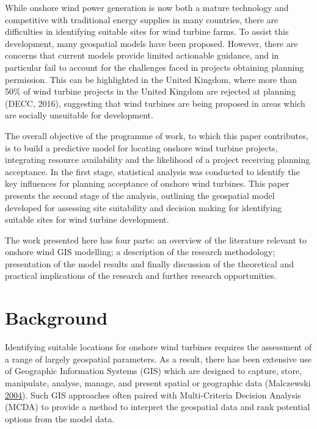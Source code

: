 \documentclass[a4paper,]{article}
\theoremstyle{definition}
\theoremstyle{definition}
\theoremstyle{remark}
\begin{document}
{While onshore wind power generation is now both a mature technology and
competitive with traditional energy supplies in many countries, there
are difficulties in identifying suitable sites for wind turbine farms.
To assist this development, many geospatial models have been proposed.
However, there are concerns that current models provide limited
actionable guidance, and in particular fail to account for the
challenges faced in projects obtaining planning permission. This can be
highlighted in the United Kingdom, where more than 50\% of wind turbine
projects in the United Kingdom are rejected at planning (DECC, 2016),
suggesting that wind turbines are being proposed in areas which are
socially unsuitable for development.

The overall objective of the programme of work, to which this paper
contributes, is to build a predictive model for locating onshore wind
turbine projects, integrating resource availability and the likelihood
of a project receiving planning acceptance. In the first stage,
statistical analysis was conducted to identify the key influences for
planning acceptance of onshore wind turbines. This paper presents the
second stage of the analysis, outlining the geospatial model developed
for assessing site suitability and decision making for identifying
suitable sites for wind turbine development.

The work presented here has four parts: an overview of the literature
relevant to onshore wind GIS modelling; a description of the research
methodology; presentation of the model results and finally discussion of
the theoretical and practical implications of the research and further
research opportunities.

\section{Background}\label{background}

Identifying suitable locations for onshore wind turbines requires the
assessment of a range of largely geospatial parameters. As a result,
there has been extensive use of Geographic Information Systems (GIS)
which are designed to capture, store, manipulate, analyse, manage, and
present spatial or geographic data (Malczewski
\protect\hyperlink{ref-Malczewski2004}{2004}). Such GIS approaches often
paired with Multi-Criteria Decision Analysis (MCDA) to provide a method
to interpret the geospatial data and rank potential options from the
model data.

}
\end{document}
